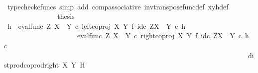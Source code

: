 \begin{isabellebody}
\ \ \ \ \ \ \ \ \ \ \ \ \ \ \isamarkupfalse%
\ {\isacharparenleft}{\kern0pt}typecheck{\isacharunderscore}{\kern0pt}cfuncs{\isacharcomma}{\kern0pt}\ simp\ add{\isacharcolon}{\kern0pt}\ comp{\isacharunderscore}{\kern0pt}associative{}\ inv{\isacharunderscore}{\kern0pt}transpose{\isacharunderscore}{\kern0pt}func{\isacharunderscore}{\kern0pt}def{}\ xyh{\isacharunderscore}{\kern0pt}def{\isacharparenright}{\kern0pt}\isanewline
\ \ \ \ \ \ \ \ \ \ \ \ \isamarkupfalse%
\ \isamarkupfalse%
\ {\isacharquery}{\kern0pt}thesis\isacommand{{\isachardot}{\kern0pt}}\isamarkupfalse%
\isanewline
\ \ \ \ \ \ \ \ \ \ \isamarkupfalse%
\isanewline
\ \ \ \ \ \ \ \ \isamarkupfalse%
\isanewline
\ \ \ \ \ \ \isamarkupfalse%
\isanewline
\ \ \ \ \ \ \isamarkupfalse%
\ \isamarkupfalse%
\ {\isachardoublequoteopen}h\ {\isacharequal}{\kern0pt}\ {\isacharparenleft}{\kern0pt}{\isacharparenleft}{\kern0pt}{\isacharparenleft}{\kern0pt}eval{\isacharunderscore}{\kern0pt}func\ Z\ {\isacharparenleft}{\kern0pt}X\ {\isasymCoprod}\ Y{\isacharparenright}{\kern0pt}\ {\isasymcirc}\isactrlsub c\ left{\isacharunderscore}{\kern0pt}coproj\ X\ Y\ {\isasymtimes}\isactrlsub f\ id\isactrlsub c\ {\isacharparenleft}{\kern0pt}Z\isactrlbsup {\isacharparenleft}{\kern0pt}X\ {\isasymCoprod}\ Y{\isacharparenright}{\kern0pt}\isactrlesup {\isacharparenright}{\kern0pt}{\isacharparenright}{\kern0pt}\isactrlsup {\isasymsharp}\ {\isasymcirc}\isactrlsub c\ h{\isacharparenright}{\kern0pt}\isactrlsup {\isasymflat}\ {\isasymamalg}\isanewline
\ \ \ \ \ \ \ \ \ \ \ \ \ \ \ \ \ \ \ \ \ {\isacharparenleft}{\kern0pt}{\isacharparenleft}{\kern0pt}eval{\isacharunderscore}{\kern0pt}func\ Z\ {\isacharparenleft}{\kern0pt}X\ {\isasymCoprod}\ Y{\isacharparenright}{\kern0pt}\ {\isasymcirc}\isactrlsub c\ right{\isacharunderscore}{\kern0pt}coproj\ X\ Y\ {\isasymtimes}\isactrlsub f\ id\isactrlsub c\ {\isacharparenleft}{\kern0pt}Z\isactrlbsup {\isacharparenleft}{\kern0pt}X\ {\isasymCoprod}\ Y{\isacharparenright}{\kern0pt}\isactrlesup {\isacharparenright}{\kern0pt}{\isacharparenright}{\kern0pt}\isactrlsup {\isasymsharp}\ {\isasymcirc}\isactrlsub c\ h{\isacharparenright}{\kern0pt}\isactrlsup {\isasymflat}\ {\isasymcirc}\isactrlsub c\isanewline
\ \ \ \ \ \ \ \ \ \ \ \ \ \ \ \ \ \ \ \ \ \ \ \ \ \ \ \ \ \ \ \ \ \ \ \ \ \ \ \ \ \ \ \ \ \ \ \ \ \ \ \ \ \ \ \ \ \ \ \ \ \ \ \ \ \ \ \ \ \ dist{\isacharunderscore}{\kern0pt}prod{\isacharunderscore}{\kern0pt}coprod{\isacharunderscore}{\kern0pt}right\ X\ Y\ H{\isacharparenright}{\kern0pt}\isactrlsup {\isasymsharp}{\isachardoublequoteclose}\isanewline

\end{isabellebody}
